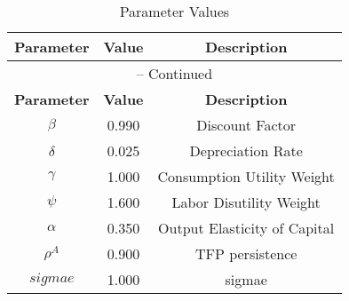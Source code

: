 \begin{center}
\begin{longtable}{ccc}
\caption{Parameter Values}\\%
\toprule%
\multicolumn{1}{c}{\textbf{Parameter}} &
\multicolumn{1}{c}{\textbf{Value}} &
 \multicolumn{1}{c}{\textbf{Description}}\\%
\midrule%
\endfirsthead
\multicolumn{3}{c}{{\tablename} \thetable{} -- Continued}\\%
\midrule%
\multicolumn{1}{c}{\textbf{Parameter}} &
\multicolumn{1}{c}{\textbf{Value}} &
  \multicolumn{1}{c}{\textbf{Description}}\\%
\midrule%
\endhead
${\beta}$ 	 & 	 0.990 	 & 	 Discount Factor\\
${\delta}$ 	 & 	 0.025 	 & 	 Depreciation Rate\\
${\gamma}$ 	 & 	 1.000 	 & 	 Consumption Utility Weight\\
${\psi}$ 	 & 	 1.600 	 & 	 Labor Disutility Weight\\
${\alpha}$ 	 & 	 0.350 	 & 	 Output Elasticity of Capital\\
${\rho^A}$ 	 & 	 0.900 	 & 	 TFP persistence\\
$sigmae$ 	 & 	 1.000 	 & 	 sigmae\\
\bottomrule%
\end{longtable}
\end{center}
